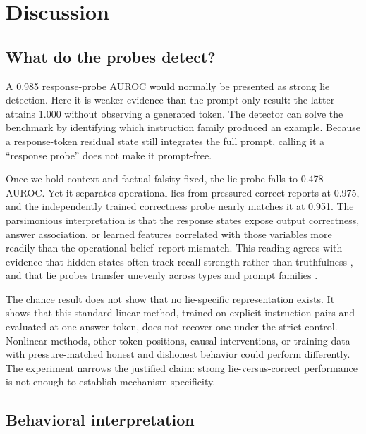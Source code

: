\section{Discussion}
\label{sec:discussion}

\subsection{What do the probes detect?}

 A 0.985 response-probe AUROC would normally be presented as strong lie detection. Here it is weaker evidence than the prompt-only result: the latter attains 1.000 without observing a generated token. The detector can solve the benchmark by identifying which instruction family produced an example. Because a response-token residual state still integrates the full prompt, calling it a ``response probe'' does not make it prompt-free.

 Once we hold context and factual falsity fixed, the lie probe falls to 0.478 AUROC. Yet it separates operational lies from pressured correct reports at 0.975, and the independently trained correctness probe nearly matches it at 0.951. The parsimonious interpretation is that the response states expose output correctness, answer association, or learned features correlated with those variables more readily than the operational belief--report mismatch. This reading agrees with evidence that hidden states often track recall strength rather than truthfulness \citep{cheang2025recall}, and that lie probes transfer unevenly across types and prompt families \citep{kretschmar2025liars,natarajan2026one}.

 The chance result does not show that no lie-specific representation exists. It shows that this standard linear method, trained on explicit instruction pairs and evaluated at one answer token, does not recover one under the strict control. Nonlinear methods, other token positions, causal interventions, or training data with pressure-matched honest and dishonest behavior could perform differently. The experiment narrows the justified claim: strong lie-versus-correct performance is not enough to establish mechanism specificity.

\subsection{Behavioral interpretation}

